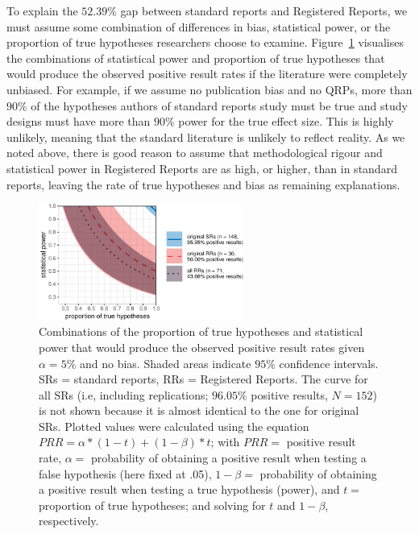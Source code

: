 \documentclass[british,,jou,floatsintext]{apa6}
\begin{document}
To explain the \(52.39 \%\) gap between standard reports and Registered Reports, we must assume some combination of differences in bias, statistical power, or the proportion of true hypotheses researchers choose to examine.
Figure~\ref{fig:powerbaserate} visualises the combinations of statistical power and proportion of true hypotheses that would produce the observed positive result rates if the literature were completely unbiased.
For example, if we assume no publication bias and no QRPs, more than \(90\%\) of the hypotheses authors of standard reports study must be true and study designs must have more than \(90\%\) power for the true effect size.
This is highly unlikely, meaning that the standard literature is unlikely to reflect reality.
As we noted above, there is good reason to assume that methodological rigour and statistical power in Registered Reports are as high, or higher, than in standard reports, leaving the rate of true hypotheses and bias as remaining explanations.



\begin{figure}

{\centering \includegraphics[width=0.6\textwidth]{manuscript_files/figure-latex/powerbaserate-1} 

}

\caption{Combinations of the proportion of true hypotheses and statistical power that would produce the observed positive result rates given \(\alpha = 5 \%\) and no bias. Shaded areas indicate \(95\%\) confidence intervals. SRs = standard reports, RRs = Registered Reports. The curve for all SRs (i.e, including replications; \(96.05 \%\) positive results, \(N = 152\)) is not shown because it is almost identical to the one for original SRs. Plotted values were calculated using the equation \(PRR = \alpha*(1-t) + (1-\beta)*t\); with \(PRR =\) positive result rate, \(\alpha =\) probability of obtaining a positive result when testing a false hypothesis (here fixed at .05), \(1-\beta =\) probability of obtaining a positive result when testing a true hypothesis (power), and \(t =\) proportion of true hypotheses; and solving for \(t\) and \(1-\beta\), respectively.}\label{fig:powerbaserate}
\end{figure}
\end{document}
